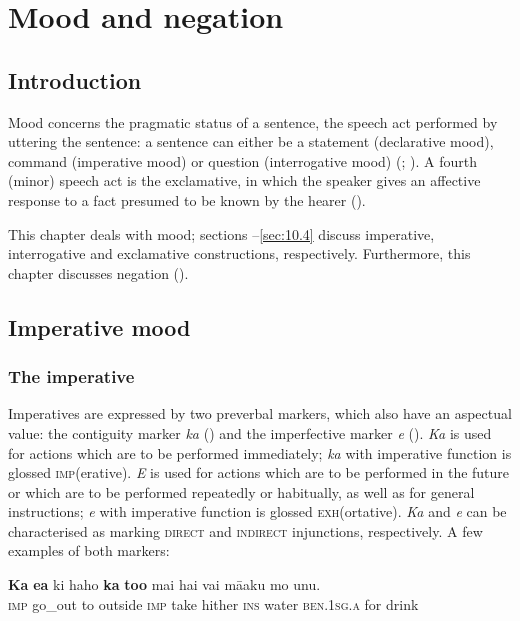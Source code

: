 \chapter[Mood and negation]{Mood and negation}\label{ch:10}
\section{Introduction}\label{sec:10.1}

Mood concerns the pragmatic status of a sentence, the speech act performed by uttering the sentence: a sentence can either be a statement (declarative mood), command (imperative mood) or question (interrogative mood) (\citealt[95]{Dixon2010-1}; \citealt[294]{Payne1997}). A fourth (minor) speech act is the exclamative, in which the speaker gives an affective response to a fact presumed to be known by the hearer (\citealt[316]{KönigSiemund2007}).

This chapter deals with mood; sections –\ref{sec:10.4} discuss imperative, interrogative and exclamative constructions, respectively. Furthermore, this chapter discusses negation ().

\section{Imperative mood}\label{sec:10.2}
\subsection{The imperative} \label{sec:10.2.1}
Imperatives are expressed by two preverbal markers, which also have an aspectual value: the contiguity marker \textit{ka} () and the imperfective marker \textit{e} (). \textit{Ka} is used for actions which are to be performed immediately; \textit{ka} with imperative function is glossed \textsc{imp}(erative). \textit{E} is used for actions which are to be performed in the future or which are to be performed repeatedly or habitually, as well as for general instructions; \textit{e} with imperative function is glossed \textsc{exh}(ortative). \textit{Ka} and \textit{e} can be characterised as marking \textsc{direct} and \textsc{indirect} injunctions, respectively. A few examples of both markers:

\ea\label{ex:10.1}
\gll \textbf{Ka} \textbf{e{\ꞌ}a} ki haho \textbf{ka} \textbf{to{\ꞌ}o} mai hai vai mā{\ꞌ}aku mo unu. \\
\textsc{imp} go\_out to outside \textsc{imp} take hither \textsc{ins} water \textsc{ben.1sg.a} for drink \\

